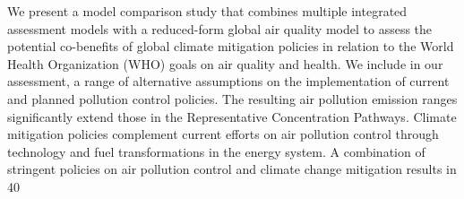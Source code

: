 We present a model comparison study that combines multiple integrated assessment models with a reduced-form global air quality model to assess the potential co-benefits of global climate mitigation policies in relation to the World Health Organization (WHO) goals on air quality and health. We include in our assessment, a range of alternative assumptions on the implementation of current and planned pollution control policies. The resulting air pollution emission ranges significantly extend those in the Representative Concentration Pathways. Climate mitigation policies complement current efforts on air pollution control through technology and fuel transformations in the energy system. A combination of stringent policies on air pollution control and climate change mitigation results in 40%